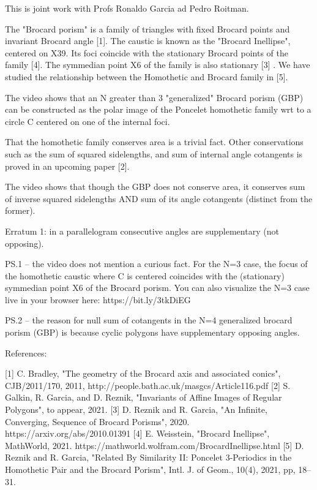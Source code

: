 This is joint work with Profs Ronaldo Garcia ad Pedro Roitman.

The "Brocard porism" is a family of triangles with fixed Brocard points and invariant Brocard angle [1]. The caustic is known as the "Brocard Inellipse", centered on X39. Its foci coincide with the stationary Brocard points of the family [4]. The symmedian point X6 of the family is also stationary [3] . We have studied the relationship between the Homothetic and Brocard family in [5]. 

The video shows that an N greater than 3 "generalized" Brocard porism (GBP) can be constructed as the polar image of the Poncelet homothetic family wrt to a circle C centered on one of the internal foci.

That the homothetic family conserves area is a trivial fact. Other conservations such as the sum of squared sidelengths, and sum of internal angle cotangents is proved in an upcoming paper [2].

The video shows that though the GBP does not conserve area, it conserves sum of inverse squared sidelengths AND sum of its angle cotangents (distinct from the former).

Erratum 1: in a parallelogram consecutive angles are supplementary (not opposing).

PS.1 -- the video does not mention a curious fact. For the N=3 case, the focus of the homothetic caustic where C is centered coincides with the (stationary) symmedian point X6 of the Brocard porism. You can also visualize the N=3 case live in your browser here: https://bit.ly/3tkDiEG

PS.2 -- the reason for null sum of cotangents in the N=4 generalized brocard porism (GBP) is because cyclic polygons have supplementary opposing angles.




References:

[1] C. Bradley, "The geometry of the Brocard axis and associated conics", CJB/2011/170, 2011, http://people.bath.ac.uk/masgcs/Article116.pdf
[2] S. Galkin, R. Garcia, and D. Reznik, "Invariants of Affine Images of Regular Polygons", to appear, 2021.
[3] D. Reznik and R. Garcia, "An Infinite, Converging, Sequence of Brocard Porisms", 2020. https://arxiv.org/abs/2010.01391
[4] E. Weisstein, "Brocard Inellipse", MathWorld, 2021. https://mathworld.wolfram.com/BrocardInellipse.html
[5] D. Reznik and R. Garcia, "Related By Similarity II: Poncelet 3-Periodics in the Homothetic Pair and the Brocard Porism", Intl. J. of Geom., 10(4), 2021, pp, 18--31.